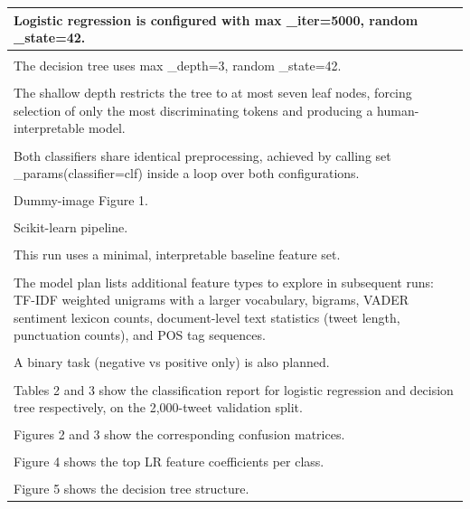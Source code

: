 \documentclass[11pt]{article}
\begin{document}
\begin{longtable}{|p{\dimexpr\linewidth-2\tabcolsep-2\arrayrulewidth\relax}|}
\hline
Logistic regression is configured with max \_iter=5000, random \_state=42. \\[2pt]
\hline
\rule{0pt}{3.5cm} \\
\hline
The decision tree uses max \_depth=3, random \_state=42. \\[2pt]
\hline
\rule{0pt}{3.5cm} \\
\hline
The shallow depth restricts the tree to at most seven leaf nodes, forcing selection of only the most discriminating tokens and producing a human-interpretable model. \\[2pt]
\hline
\rule{0pt}{3.5cm} \\
\hline
Both classifiers share identical preprocessing, achieved by calling set \_params(classifier=clf) inside a loop over both configurations. \\[2pt]
\hline
\rule{0pt}{3.5cm} \\
\hline
Dummy-image Figure 1. \\[2pt]
\hline
\rule{0pt}{3.5cm} \\
\hline
Scikit-learn pipeline. \\[2pt]
\hline
\rule{0pt}{3.5cm} \\
\hline
This run uses a minimal, interpretable baseline feature set. \\[2pt]
\hline
\rule{0pt}{3.5cm} \\
\hline
The model plan lists additional feature types to explore in subsequent runs: TF-IDF weighted unigrams with a larger vocabulary, bigrams, VADER sentiment lexicon counts, document-level text statistics (tweet length, punctuation counts), and POS tag sequences. \\[2pt]
\hline
\rule{0pt}{3.5cm} \\
\hline
A binary task (negative vs positive only) is also planned. \\[2pt]
\hline
\rule{0pt}{3.5cm} \\
\hline
Tables 2 and 3 show the classification report for logistic regression and decision tree respectively, on the 2,000-tweet validation split. \\[2pt]
\hline
\rule{0pt}{3.5cm} \\
\hline
Figures 2 and 3 show the corresponding confusion matrices. \\[2pt]
\hline
\rule{0pt}{3.5cm} \\
\hline
Figure 4 shows the top LR feature coefficients per class. \\[2pt]
\hline
\rule{0pt}{3.5cm} \\
\hline
Figure 5 shows the decision tree structure. \\[2pt]

\end{longtable}
\end{document}
